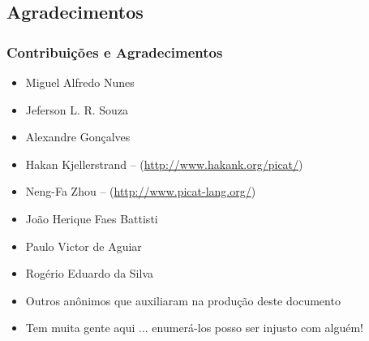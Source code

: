 \subsection{Agradecimentos}

\begin{frame}[fragile]
  \frametitle{Contribuições e Agradecimentos}

  \begin{itemize}
  \item Miguel Alfredo Nunes
  \item Jeferson L. R. Souza
    \item Alexandre Gonçalves 
    \item Hakan Kjellerstrand -- (\url{http://www.hakank.org/picat/})
    \item Neng-Fa Zhou -- (\url{http://www.picat-lang.org/})
    \item João Herique Faes Battisti
    \item Paulo Victor de Aguiar
    \item Rogério Eduardo da Silva
    \item Outros anônimos que auxiliaram na produção deste documento
    \item Tem muita gente aqui ... enumerá-los posso ser injusto com alguém!
  \end{itemize}

\end{frame}


